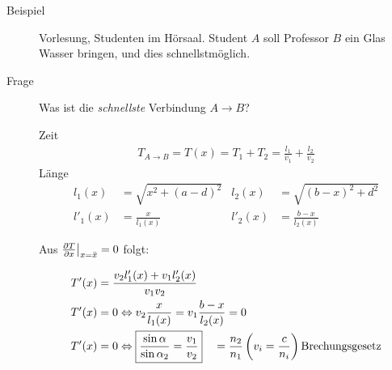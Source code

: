 \begin{description}
\item[Beispiel] Vorlesung, Studenten im Hörsaal. Student $A$ soll
  Professor $B$ ein Glas Wasser bringen, und dies schnellstmöglich.

\skizze{}

\item[Frage] Was ist die \emph{schnellste} Verbindung $A \rightarrow B$?

  Zeit
  \begin{align*}
    T_{A \rightarrow B} = T(x) = T_1+T_{2} = \frac{l_1}{v_1} +
    \frac{l_2}{v_2}
  \end{align*}
  Länge
  \begin{align*}
    l_1(x) &= \sqrt{x^2+ (a-d)^2}
    & l_2(x) &= \sqrt{(b-x)^2 + d^2}\\
    l'_1(x) &= \frac{x}{l_{1}(x)}
    & l'_2(x) &= \frac{b-x}{l_{2}(x)}
  \end{align*}

\skizze{}

Aus $\frac{\partial T}{\partial x} \big|_{x=\bar{x}} = 0$ folgt:

\begin{align*}
  T'(x) &= \frac{v_2 l'_1(x) + v_1 l'_2(x)}{v_1v_2}\\
  T'(x) &= 0 \Leftrightarrow v_2 \frac{x}{l_1(x)}
          = v_1 \frac{b-x}{l_2(x)} = 0\\
  T'(x) &= 0 \Leftrightarrow \boxed{ \frac{\sin{\alpha}}{\sin{\alpha_2}}
          = \frac{v_1}{v_2} }
          \quad = \frac{n_2}{n_1} \left( v_i = \frac{c}{n_i}  \right)
          \textnormal{Brechungsgesetz}
\end{align*}

\end{description}

